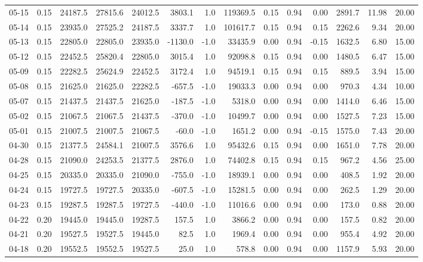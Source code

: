 \begin{threeparttable}
{\begin{tabular}{lrrrrrrrrrrrrr}
05-15 & 0.15 & 24187.5 & 27815.6 & 24012.5 & 3803.1 & 1.0 & 119369.5 & 0.15 & 0.94 & 0.00 & 2891.7 & 11.98 & 20.00 \\
05-14 & 0.15 & 23935.0 & 27525.2 & 24187.5 & 3337.7 & 1.0 & 101617.7 & 0.15 & 0.94 & 0.15 & 2262.6 & 9.34 & 20.00 \\
05-13 & 0.15 & 22805.0 & 22805.0 & 23935.0 & -1130.0 & -1.0 & 33435.9 & 0.00 & 0.94 & -0.15 & 1632.5 & 6.80 & 15.00 \\
05-12 & 0.15 & 22452.5 & 25820.4 & 22805.0 & 3015.4 & 1.0 & 92098.8 & 0.15 & 0.94 & 0.00 & 1480.5 & 6.47 & 15.00 \\
05-09 & 0.15 & 22282.5 & 25624.9 & 22452.5 & 3172.4 & 1.0 & 94519.1 & 0.15 & 0.94 & 0.15 & 889.5 & 3.94 & 15.00 \\
05-08 & 0.15 & 21625.0 & 21625.0 & 22282.5 & -657.5 & -1.0 & 19033.3 & 0.00 & 0.94 & 0.00 & 970.3 & 4.34 & 10.00 \\
05-07 & 0.15 & 21437.5 & 21437.5 & 21625.0 & -187.5 & -1.0 & 5318.0 & 0.00 & 0.94 & 0.00 & 1414.0 & 6.46 & 15.00 \\
05-02 & 0.15 & 21067.5 & 21067.5 & 21437.5 & -370.0 & -1.0 & 10499.7 & 0.00 & 0.94 & 0.00 & 1527.5 & 7.23 & 15.00 \\
05-01 & 0.15 & 21007.5 & 21007.5 & 21067.5 & -60.0 & -1.0 & 1651.2 & 0.00 & 0.94 & -0.15 & 1575.0 & 7.43 & 20.00 \\
04-30 & 0.15 & 21377.5 & 24584.1 & 21007.5 & 3576.6 & 1.0 & 95432.6 & 0.15 & 0.94 & 0.00 & 1651.0 & 7.78 & 20.00 \\
04-28 & 0.15 & 21090.0 & 24253.5 & 21377.5 & 2876.0 & 1.0 & 74402.8 & 0.15 & 0.94 & 0.15 & 967.2 & 4.56 & 25.00 \\
04-25 & 0.15 & 20335.0 & 20335.0 & 21090.0 & -755.0 & -1.0 & 18939.1 & 0.00 & 0.94 & 0.00 & 408.5 & 1.92 & 20.00 \\
04-24 & 0.15 & 19727.5 & 19727.5 & 20335.0 & -607.5 & -1.0 & 15281.5 & 0.00 & 0.94 & 0.00 & 262.5 & 1.29 & 20.00 \\
04-23 & 0.15 & 19287.5 & 19287.5 & 19727.5 & -440.0 & -1.0 & 11016.6 & 0.00 & 0.94 & 0.00 & 173.0 & 0.88 & 20.00 \\
04-22 & 0.20 & 19445.0 & 19445.0 & 19287.5 & 157.5 & 1.0 & 3866.2 & 0.00 & 0.94 & 0.00 & 157.5 & 0.82 & 20.00 \\
04-21 & 0.20 & 19527.5 & 19527.5 & 19445.0 & 82.5 & 1.0 & 1969.4 & 0.00 & 0.94 & 0.00 & 955.4 & 4.92 & 20.00 \\
04-18 & 0.20 & 19552.5 & 19552.5 & 19527.5 & 25.0 & 1.0 & 578.8 & 0.00 & 0.94 & 0.00 & 1157.9 & 5.93 & 20.00 \\

\end{tabular}}
\end{threeparttable}
